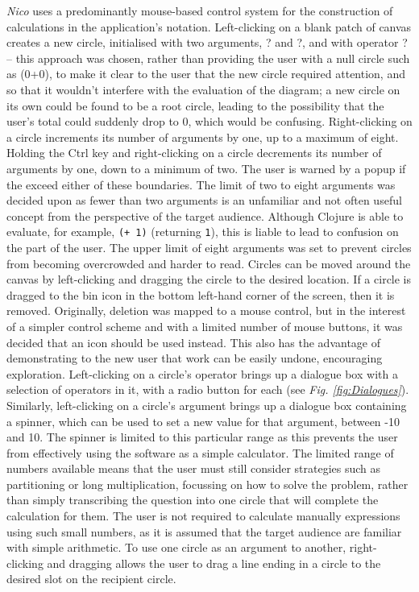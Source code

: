 \documentclass[12pt,twoside,notitlepage,xetex]{report}
\begin{document}
\emph{Nico} uses a predominantly mouse-based control system for the
construction of calculations in the application's notation.  Left-clicking on a
blank patch of canvas creates a new circle, initialised with two arguments,
{\sfapp ?} and {\sfapp ?}, and with operator {\sfapp ?} -- this approach was chosen, rather than providing the user with a null circle such as (0+0), to make it clear to the user that the new circle required attention, and so that it wouldn't interfere with the evaluation of the diagram; a new circle on its own could be found to be a root circle, leading to the possibility that the user's total could suddenly drop to 0, which would be confusing.  Right-clicking on a
circle increments its number of arguments by one, up to a maximum of eight.
Holding the Ctrl key and right-clicking on a circle decrements its number of
arguments by one, down to a minimum of two.  The user is warned by a popup if the exceed either of these boundaries.  The limit of two to eight arguments was decided upon as fewer than two arguments is an unfamiliar and not often useful concept from the perspective of the target audience.  Although Clojure is able to evaluate, for example, \verb¬(+ 1)¬ (returning \verb¬1¬), this is liable to lead to confusion on the part of the user.  The upper limit of eight arguments was set to prevent circles from becoming overcrowded and harder to read.
Circles can be moved around the
canvas by left-clicking and dragging the circle to the desired location.  If a
circle is dragged to the bin icon in the bottom left-hand corner of the screen,
then it is removed.  Originally, deletion was mapped to a mouse control, but in the interest of a simpler control scheme and with a limited number of mouse buttons, it was decided that an icon should be used instead.  This also has the advantage of demonstrating to the new user that work can be easily undone, encouraging exploration.  Left-clicking on a circle's operator brings up a dialogue
box with a selection of operators in it, with a radio button for each (see
\emph{Fig. \ref{fig:Dialogues}}).  Similarly, left-clicking on a circle's argument brings up a
dialogue box containing a spinner, which can be used to set a new value for
that argument, between -10 and 10.  The spinner is limited to this particular
range as this prevents the user from effectively using the software as a simple
calculator.  The limited range of numbers available means that the user must
still consider strategies such as partitioning or long multiplication,
focussing on how to solve the problem, rather than simply transcribing the
question into one circle that will complete the calculation for them.  The user is not required to calculate manually expressions using such small numbers, as it is assumed that the target audience are familiar with simple arithmetic.  To use
one circle as an argument to another, right-clicking and dragging allows the
user to drag a line ending in a circle to the desired slot on the recipient
circle.
\end{document}

